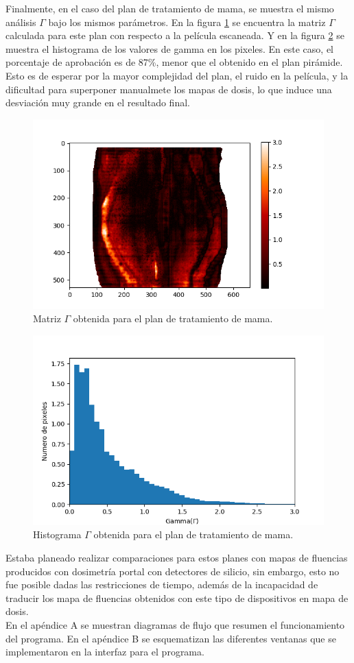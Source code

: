 Finalmente, en el caso del plan de tratamiento de mama, se muestra el mismo análisis $\Gamma$ bajo los mismos parámetros. En la figura \ref{fig:matrixGAmmaMAma} se encuentra la matriz $\Gamma$ calculada para este plan con respecto a la película escaneada. Y en la figura \ref{fig:histogramaGAmmaMama} se muestra el histograma de los valores de gamma en los pixeles. En este caso, el porcentaje de aprobación es de 87\%, menor que el obtenido en el plan pirámide. Esto es de esperar por la mayor complejidad del plan, el ruido en la película, y la dificultad para superponer manualmete los mapas de dosis, lo que induce una desviación muy grande en el resultado final.\\

\begin{figure}[H]
	\centering
	\includegraphics[width=0.7\linewidth]{images/gammaMama.png}
	\caption{Matriz $\Gamma$ obtenida para el plan de tratamiento de mama. }
	\label{fig:matrixGAmmaMAma}
\end{figure}
\begin{figure}[H]
	\centering
	\includegraphics[width=0.7\linewidth]{images/histogramaDosisMama.png}
	\caption{Histograma $\Gamma$ obtenida para el plan de tratamiento de mama.  }
	\label{fig:histogramaGAmmaMama}
\end{figure}

Estaba planeado realizar comparaciones para estos planes con mapas de fluencias producidos con dosimetría portal con detectores de silicio, sin embargo, esto no fue posible dadas las restricciones de tiempo, además de la incapacidad de traducir los mapa de fluencias obtenidos con este tipo de dispositivos en mapa de dosis.\\

En el apéndice A se muestran diagramas de flujo que resumen el funcionamiento del programa. En el apéndice B se esquematizan las diferentes ventanas que se implementaron en la interfaz para el programa.\\ 





